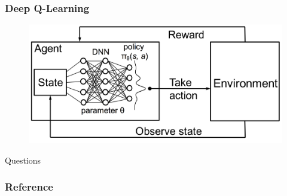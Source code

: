 \documentclass[presentation]{beamer}
\begin{document}
\begin{frame}
    \frametitle{Deep Q-Learning}
    \begin{figure}
        \centering
        \includegraphics[width=\linewidth]{dql.png}
    \end{figure}
\end{frame}

\begin{frame}[standout]
    Questions
\end{frame}

\begin{frame}[allowframebreaks]
    \frametitle{Reference}

    
    

\end{frame}
\end{document}
